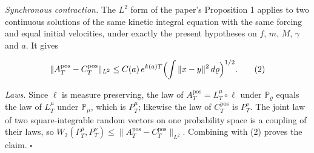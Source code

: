 \documentclass[11pt,a4paper]{article}
\begin{document}
\emph{Synchronous contraction.} The \(L^2\) form of the paper's Proposition 1 \cite[Section~3.16.2]{LangevinLean2026Kinetic} applies to two continuous solutions of the same kinetic integral equation with the same forcing and equal initial velocities, under exactly the present hypotheses on \(f\), \(m\), \(M\), \(\gamma\) and \(a\). It gives


\[\|A_T^{\mathrm{pos}}-C_T^{\mathrm{pos}}\|_{L^2}\le C(a)\,e^{k(a)T}\Bigl(\int\|x-y\|^2\,d\varrho\Bigr)^{1/2}.\qquad(2)\]


\emph{Laws.} Since \(\ell\) is measure preserving, the law of \(A_T^{\mathrm{pos}}=L^\mu_T\circ\ell\) under \(\mathbb P_\varrho\) equals the law of \(L^\mu_T\) under \(\mathbb P_\mu\), which is \(P^\mu_T\); likewise the law of \(C_T^{\mathrm{pos}}\) is \(P^\nu_T\). The joint law of two square-integrable random vectors on one probability space is a coupling of their laws, so \(W_2(P^\mu_T,P^\nu_T)\le\|A_T^{\mathrm{pos}}-C_T^{\mathrm{pos}}\|_{L^2}\). Combining with (2) proves the claim. \(\square\)
\end{document}
